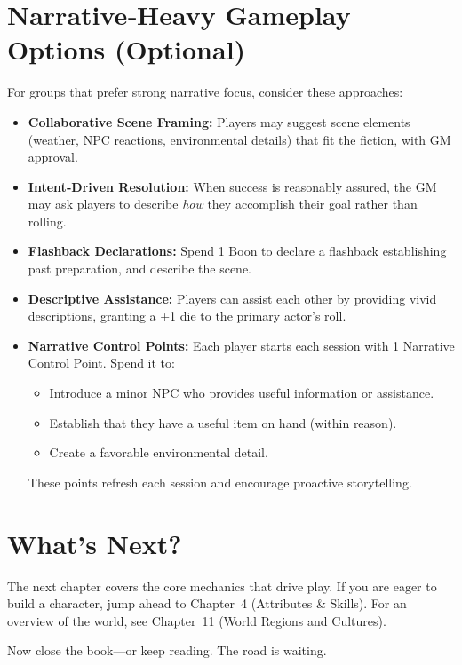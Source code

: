 \section*{Narrative‑Heavy Gameplay Options (Optional)}

For groups that prefer strong narrative focus, consider these approaches:

\begin{itemize}
\item \textbf{Collaborative Scene Framing:} Players may suggest scene elements (weather, NPC reactions, environmental details) that fit the fiction, with GM approval.
\item \textbf{Intent‑Driven Resolution:} When success is reasonably assured, the GM may ask players to describe \emph{how} they accomplish their goal rather than rolling.
\item \textbf{Flashback Declarations:} Spend 1 Boon to declare a flashback establishing past preparation, and describe the scene.
\item \textbf{Descriptive Assistance:} Players can assist each other by providing vivid descriptions, granting a +1 die to the primary actor’s roll.
\item \textbf{Narrative Control Points:} Each player starts each session with 1 Narrative Control Point. Spend it to:
\begin{itemize}
\item Introduce a minor NPC who provides useful information or assistance.
\item Establish that they have a useful item on hand (within reason).
\item Create a favorable environmental detail.
\end{itemize}
These points refresh each session and encourage proactive storytelling.
\end{itemize}

\section*{What’s Next?}

The next chapter covers the core mechanics that drive play. If you are eager to build a character, jump ahead to Chapter 4 (Attributes & Skills). For an overview of the world, see Chapter 11 (World Regions and Cultures).

Now close the book—or keep reading. The road is waiting.